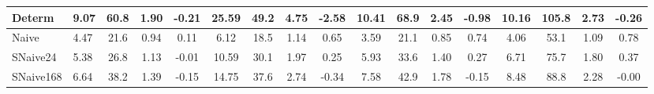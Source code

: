 \begin{table}[H]
{\begin{tabular}{llccccccccccccccc}
\midrule
Determ & 9.07 & 60.8 & 1.90 & -0.21 & 25.59 & 49.2 & 4.75 & -2.58 & 10.41 & 68.9 & 2.45 & -0.98 & 10.16 & 105.8 & 2.73 & -0.26 \\
\midrule
Naive & 4.47 & 21.6 & 0.94 & 0.11 & 6.12 & 18.5 & 1.14 & 0.65 & 3.59 & 21.1 & 0.85 & 0.74 & 4.06 & 53.1 & 1.09 & 0.78 \\
\midrule
SNaive24 & 5.38 & 26.8 & 1.13 & -0.01 & 10.59 & 30.1 & 1.97 & 0.25 & 5.93 & 33.6 & 1.40 & 0.27 & 6.71 & 75.7 & 1.80 & 0.37 \\
\midrule
SNaive168 & 6.64 & 38.2 & 1.39 & -0.15 & 14.75 & 37.6 & 2.74 & -0.34 & 7.58 & 42.9 & 1.78 & -0.15 & 8.48 & 88.8 & 2.28 & -0.00 \\
\bottomrule
\end{tabular}}
\end{table}
